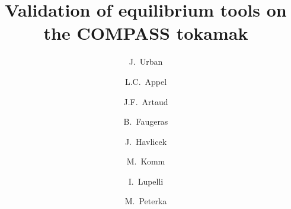 \documentclass[preprint,5p,times]{elsarticle}
\begin{document}
\begin{frontmatter}



\title{Validation of equilibrium tools on the COMPASS tokamak}

 \author[label1]{J.~Urban}
 \author[label2]{L.C.~Appel}
 \author[label3]{J.F.~Artaud} 
 \author[label4]{B.~Faugeras} 
 \author[label1,label5]{J.~Havlicek}
 \author[label1]{M.~Komm}
 \author[label2]{I.~Lupelli} 
 \author[label1,label5]{M.~Peterka} 
 \address[label1]{Institute of Plasma Physics ASCR, Za~Slovankou 3, 182 00 Praha 8, Czech Republic}
 \address[label2]{CCFE, Culham Science Centre, Abingdon, Oxfordshire, UK}
 \address[label3]{CEA, IRFM, F-13108 Saint Paul Lez Durance, France}
 \address[label4]{Laboratoire J.A. Dieudonné, UMR 7351, Université de Nice Sophia-Antipolis, Parc Valrose, 06108
Nice Cedex 02, France}
 \address[label5]{Department of Surface and Plasma Science, Faculty of Mathematics and Physics, Charles University in Prague, V Hole\v{s}ovi\v{c}k\'ach 2, 180~00 Praha 8, Czech Republic}


\end{frontmatter}
\end{document}
